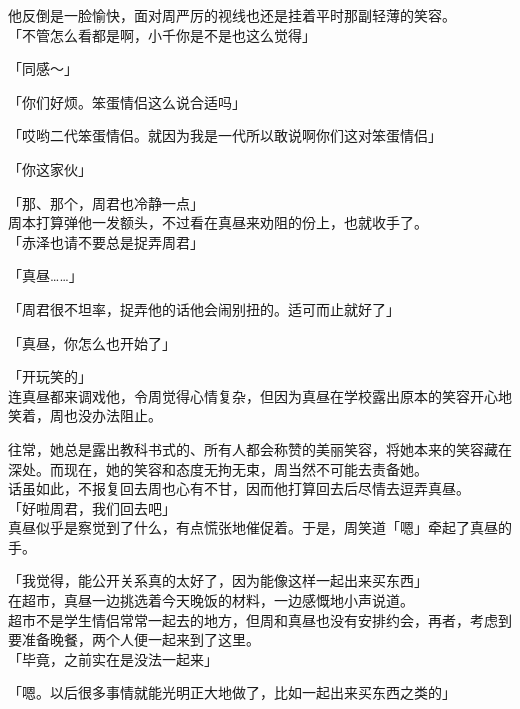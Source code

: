 他反倒是一脸愉快，面对周严厉的视线也还是挂着平时那副轻薄的笑容。\\

「不管怎么看都是啊，小千你是不是也这么觉得」

「同感～」

「你们好烦。笨蛋情侣这么说合适吗」

「哎哟二代笨蛋情侣。就因为我是一代所以敢说啊你们这对笨蛋情侣」

「你这家伙」

「那、那个，周君也冷静一点」\\

周本打算弹他一发额头，不过看在真昼来劝阻的份上，也就收手了。\\

「赤泽也请不要总是捉弄周君」

「真昼……」

「周君很不坦率，捉弄他的话他会闹别扭的。适可而止就好了」

「真昼，你怎么也开始了」

「开玩笑的」\\

连真昼都来调戏他，令周觉得心情复杂，但因为真昼在学校露出原本的笑容开心地笑着，周也没办法阻止。

往常，她总是露出教科书式的、所有人都会称赞的美丽笑容，将她本来的笑容藏在深处。而现在，她的笑容和态度无拘无束，周当然不可能去责备她。\\

话虽如此，不报复回去周也心有不甘，因而他打算回去后尽情去逗弄真昼。\\

「好啦周君，我们回去吧」\\

真昼似乎是察觉到了什么，有点慌张地催促着。于是，周笑道「嗯」牵起了真昼的手。\\

\vspace{2\baselineskip}

「我觉得，能公开关系真的太好了，因为能像这样一起出来买东西」\\

在超市，真昼一边挑选着今天晚饭的材料，一边感慨地小声说道。\\

超市不是学生情侣常常一起去的地方，但周和真昼也没有安排约会，再者，考虑到要准备晚餐，两个人便一起来到了这里。\\

「毕竟，之前实在是没法一起来」

「嗯。以后很多事情就能光明正大地做了，比如一起出来买东西之类的」

